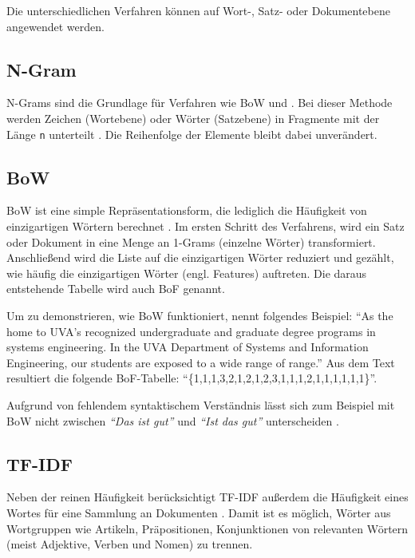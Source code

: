 Die unterschiedlichen Verfahren können auf Wort-, Satz- oder Dokumentebene angewendet werden.

\subsection*{N-Gram}

N-Grams sind die Grundlage für Verfahren wie \ac{BoW} und \ft. Bei dieser Methode werden Zeichen (Wortebene) oder Wörter (Satzebene) in Fragmente mit der Länge \texttt{n} unterteilt \autocite[5]{kowsari_text_2019}. Die Reihenfolge der Elemente bleibt dabei unverändert.

\subsection*{\acl{BoW}} 

\ac{BoW} ist eine simple Repräsentationsform, die lediglich die Häufigkeit von einzigartigen Wörtern berechnet \autocite[6]{kowsari_text_2019}. Im ersten Schritt des Verfahrens, wird ein Satz oder Dokument in eine Menge an 1-Grams (einzelne Wörter) transformiert. Anschließend wird die Liste auf die einzigartigen Wörter reduziert und gezählt, wie häufig die einzigartigen Wörter (engl. Features) auftreten. Die daraus entstehende Tabelle wird auch \ac{BoF} genannt.

Um zu demonstrieren, wie \ac{BoW} funktioniert, nennt \textcite[6]{kowsari_text_2019} folgendes Beispiel: \enquote{As the home to UVA’s recognized undergraduate and graduate degree programs in systems engineering. In the UVA Department of Systems and Information Engineering, our students are exposed to a wide range of range.} Aus dem Text resultiert die folgende \ac{BoF}-Tabelle: \enquote{\{1,1,1,3,2,1,2,1,2,3,1,1,1,2,1,1,1,1,1,1\}}.

Aufgrund von fehlendem syntaktischem Verständnis lässt sich zum Beispiel mit \ac{BoW} nicht zwischen \textit{\enquote{Das ist gut}} und \textit{\enquote{Ist das gut}} unterscheiden \autocite[6]{kowsari_text_2019}.

\subsection*{\acl{TF-IDF}}

Neben der reinen Häufigkeit berücksichtigt \ac{TF-IDF} außerdem die Häufigkeit eines Wortes für eine Sammlung an Dokumenten \autocite[7]{kowsari_text_2019}. Damit ist es möglich, Wörter aus Wortgruppen wie Artikeln, Präpositionen, Konjunktionen von relevanten Wörtern (meist Adjektive, Verben und Nomen) zu trennen.

